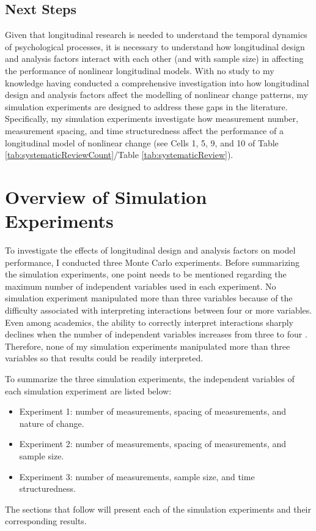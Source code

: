 \documentclass[
12pt, %
twoside,
english]{guelphthesis}
\begin{document}
\hypertarget{next-steps}{%
\subsection{Next Steps}\label{next-steps}}

Given that longitudinal research is needed to understand the temporal dynamics of psychological processes, it is necessary to understand how longitudinal design and analysis factors interact with each other (and with sample size) in affecting the performance of nonlinear longitudinal models. With no study to my knowledge having conducted a comprehensive investigation into how longitudinal design and analysis factors affect the modelling of nonlinear change patterns, my simulation experiments are designed to address these gaps in the literature. Specifically, my simulation experiments investigate how measurement number, measurement spacing, and time structuredness affect the performance of a longitudinal model of nonlinear change (see Cells 1, 5, 9, and 10 of Table \ref{tab:systematicReviewCount}/Table \ref{tab:systematicReview}).

\hypertarget{overview-of-simulation-experiments}{%
\section{Overview of Simulation Experiments}\label{overview-of-simulation-experiments}}

To investigate the effects of longitudinal design and analysis factors on model performance, I conducted three Monte Carlo experiments. Before summarizing the simulation experiments, one point needs to be mentioned regarding the maximum number of independent variables used in each experiment. No simulation experiment manipulated more than three variables because of the difficulty associated with interpreting interactions between four or more variables. Even among academics, the ability to correctly interpret interactions sharply declines when the number of independent variables increases from three to four \autocite{halford2005}. Therefore, none of my simulation experiments manipulated more than three variables so that results could be readily interpreted.

To summarize the three simulation experiments, the independent variables of each simulation experiment are listed below:
\begin{itemize}
\tightlist
\item
  Experiment 1: number of measurements, spacing of measurements, and nature of change.
\item
  Experiment 2: number of measurements, spacing of measurements, and sample size.
\item
  Experiment 3: number of measurements, sample size, and time structuredness.
\end{itemize}
\noindent The sections that follow will present each of the simulation experiments and their corresponding results.
\end{document}
